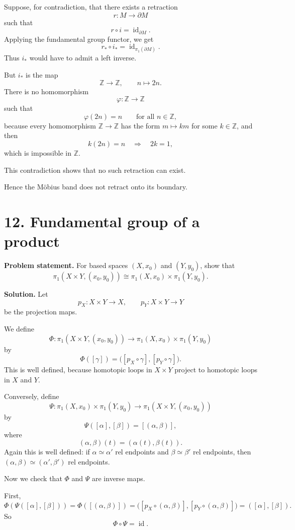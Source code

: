 \documentclass[12pt,a4paper]{article}
\theoremstyle{notespace}
\begin{document}
Suppose, for contradiction, that there exists a retraction
\[
r:M\to \partial M
\]
such that
\[
r\circ i=\operatorname{id}_{\partial M}.
\]
Applying the fundamental group functor, we get
\[
r_*\circ i_*=\operatorname{id}_{\pi_1(\partial M)}.
\]
Thus \(i_*\) would have to admit a left inverse.

But \(i_*\) is the map
\[
\mathbb Z \to \mathbb Z,
\qquad
n\mapsto 2n.
\]
There is no homomorphism
\[
\varphi:\mathbb Z\to\mathbb Z
\]
such that
\[
\varphi(2n)=n
\qquad\text{for all }n\in\mathbb Z,
\]
because every homomorphism \(\mathbb Z\to\mathbb Z\) has the form \(m\mapsto km\) for some \(k\in\mathbb Z\), and then
\[
k(2n)=n
\quad\Longrightarrow\quad
2k=1,
\]
which is impossible in \(\mathbb Z\).

This contradiction shows that no such retraction can exist.

Hence the Möbius band does not retract onto its boundary.

\bigskip

\section{12. Fundamental group of a product}

\textbf{Problem statement.} For based spaces \((X,x_0)\) and \((Y,y_0)\), show that
\[
\pi_1(X\times Y,(x_0,y_0))
\cong
\pi_1(X,x_0)\times \pi_1(Y,y_0).
\]

\textbf{Solution.}
Let
\[
p_X:X\times Y\to X,
\qquad
p_Y:X\times Y\to Y
\]
be the projection maps.

We define
\[
\Phi:\pi_1(X\times Y,(x_0,y_0))
\longrightarrow
\pi_1(X,x_0)\times \pi_1(Y,y_0)
\]
by
\[
\Phi([\gamma])
=
\bigl([p_X\circ \gamma],[p_Y\circ \gamma]\bigr).
\]
This is well defined, because homotopic loops in \(X\times Y\) project to homotopic loops in \(X\) and \(Y\).

Conversely, define
\[
\Psi:\pi_1(X,x_0)\times \pi_1(Y,y_0)
\longrightarrow
\pi_1(X\times Y,(x_0,y_0))
\]
by
\[
\Psi([\alpha],[\beta])=[(\alpha,\beta)],
\]
where
\[
(\alpha,\beta)(t)=(\alpha(t),\beta(t)).
\]
Again this is well defined: if \(\alpha\simeq \alpha'\) rel endpoints and \(\beta\simeq \beta'\) rel endpoints, then \((\alpha,\beta)\simeq(\alpha',\beta')\) rel endpoints.

Now we check that \(\Phi\) and \(\Psi\) are inverse maps.

First,
\[
\Phi(\Psi([\alpha],[\beta]))
=
\Phi([(\alpha,\beta)])
=
\bigl([p_X\circ(\alpha,\beta)],[p_Y\circ(\alpha,\beta)]\bigr)
=
([\alpha],[\beta]).
\]
So
\[
\Phi\circ\Psi=\operatorname{id}.
\]
\end{document}
